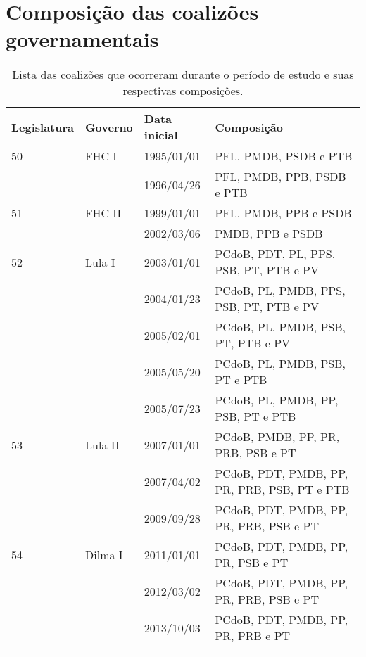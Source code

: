 \chapter{Composição das coalizões governamentais}
\label{apendice:composicao-coalizoes}

\begin{longtable}{l l l l}
\centering
  Legislatura & Governo & Data inicial & Composição \\
  \hline
  50\textordfeminine{} & FHC I & 1995/01/01 & PFL, PMDB, PSDB e PTB \\
  & & 1996/04/26 & PFL, PMDB, PPB, PSDB e PTB \\
  51\textordfeminine{} & FHC II & 1999/01/01 & PFL, PMDB, PPB e PSDB \\
  & & 2002/03/06 & PMDB, PPB e PSDB \\
  52\textordfeminine{} & Lula I & 2003/01/01 & PCdoB, PDT, PL, PPS, PSB, PT, PTB e PV \\
  & & 2004/01/23 & PCdoB, PL, PMDB, PPS, PSB, PT, PTB e PV \\
  & & 2005/02/01 & PCdoB, PL, PMDB, PSB, PT, PTB e PV \\
  & & 2005/05/20 & PCdoB, PL, PMDB, PSB, PT e PTB \\
  & & 2005/07/23 & PCdoB, PL, PMDB, PP, PSB, PT e PTB \\
  53\textordfeminine{} & Lula II & 2007/01/01 & PCdoB, PMDB, PP, PR, PRB, PSB e PT \\
  & & 2007/04/02 & PCdoB, PDT, PMDB, PP, PR, PRB, PSB, PT e PTB \\
  & & 2009/09/28 & PCdoB, PDT, PMDB, PP, PR, PRB, PSB e PT \\
  54\textordfeminine{} & Dilma I & 2011/01/01 & PCdoB, PDT, PMDB, PP, PR, PSB e PT \\
  & & 2012/03/02 & PCdoB, PDT, PMDB, PP, PR, PRB, PSB e PT \\
  & & 2013/10/03 & PCdoB, PDT, PMDB, PP, PR, PRB e PT \\
\caption{Lista das coalizões que ocorreram durante o período de estudo e suas respectivas composições.}
\end{longtable}
